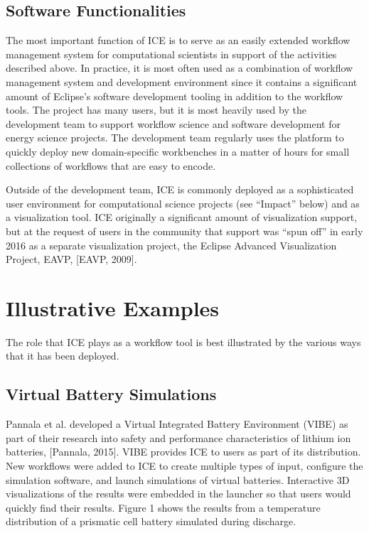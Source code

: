 \subsection{Software Functionalities}\label{software-functionalities}

The most important function of ICE is to serve as an easily extended
workflow management system for computational scientists in support of
the activities described above. In practice, it is most often used as a
combination of workflow management system and development environment
since it contains a significant amount of Eclipse's software development
tooling in addition to the workflow tools. The project has many users,
but it is most heavily used by the development team to support workflow
science and software development for energy science projects. The
development team regularly uses the platform to quickly deploy new
domain-specific workbenches in a matter of hours for small collections
of workflows that are easy to encode.

Outside of the development team, ICE is commonly deployed as a
sophisticated user environment for computational science projects (see
``Impact'' below) and as a visualization tool. ICE originally a
significant amount of visualization support, but at the request of users
in the community that support was ``spun off'' in early 2016 as a
separate visualization project, the Eclipse Advanced Visualization
Project, EAVP, {[}EAVP, 2009{]}.

\section{Illustrative Examples}\label{illustrative-examples}

The role that ICE plays as a workflow tool is best illustrated by the
various ways that it has been deployed.

\subsection{Virtual Battery
Simulations}\label{virtual-battery-simulations}

Pannala et al. developed a Virtual Integrated Battery Environment (VIBE)
as part of their research into safety and performance characteristics of
lithium ion batteries, {[}Pannala, 2015{]}. VIBE provides ICE to users
as part of its distribution. New workflows were added to ICE to create
multiple types of input, configure the simulation software, and launch
simulations of virtual batteries. Interactive 3D visualizations of the
results were embedded in the launcher so that users would quickly find
their results. Figure 1 shows the results from a temperature
distribution of a prismatic cell battery simulated during discharge.

